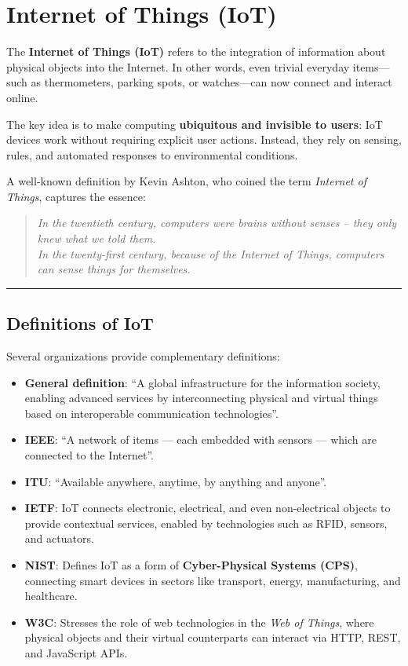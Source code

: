 \documentclass[a4paper, 12pt]{book} %
\begin{document}
\chapter{Internet of Things (IoT)}\label{internet-of-things-iot}

The \textbf{Internet of Things (IoT)} refers to the integration of
information about physical objects into the Internet. In other words,
even trivial everyday items---such as thermometers, parking spots, or
watches---can now connect and interact online.

The key idea is to make computing \textbf{ubiquitous and invisible to
users}: IoT devices work without requiring explicit user actions.
Instead, they rely on sensing, rules, and automated responses to
environmental conditions.

A well-known definition by Kevin Ashton, who coined the term
\emph{Internet of Things}, captures the essence:

\begin{quote}
\emph{In the twentieth century, computers were brains without senses --
they only knew what we told them.\\
In the twenty-first century, because of the Internet of Things,
computers can sense things for themselves.}
\end{quote}

\begin{center}\rule{0.5\linewidth}{0.5pt}\end{center}

\section{Definitions of IoT}\label{definitions-of-iot}

Several organizations provide complementary definitions:

\begin{itemize}
\item
  \textbf{General definition}: ``A global infrastructure for the
  information society, enabling advanced services by interconnecting
  physical and virtual things based on interoperable communication
  technologies''.
\item
  \textbf{IEEE}: ``A network of items --- each embedded with sensors ---
  which are connected to the Internet''.
\item
  \textbf{ITU}: ``Available anywhere, anytime, by anything and anyone''.
\item
  \textbf{IETF}: IoT connects electronic, electrical, and even
  non-electrical objects to provide contextual services, enabled by
  technologies such as RFID, sensors, and actuators.
\item
  \textbf{NIST}: Defines IoT as a form of \textbf{Cyber-Physical Systems
  (CPS)}, connecting smart devices in sectors like transport, energy,
  manufacturing, and healthcare.
\item
  \textbf{W3C}: Stresses the role of web technologies in the \emph{Web
  of Things}, where physical objects and their virtual counterparts can
  interact via HTTP, REST, and JavaScript APIs.
\end{itemize}
\end{document}
